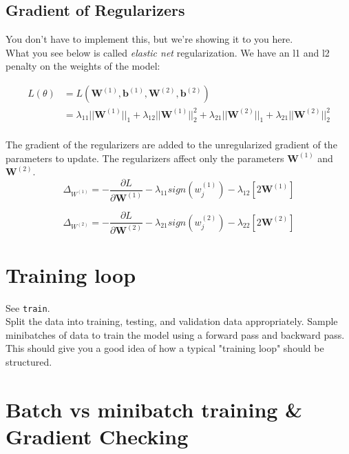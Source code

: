 \documentclass[reqno]{amsart}
\theoremstyle{definition}
\theoremstyle{remark}
\numberwithin{equation}{section}
\begin{document}
\subsection{Gradient of Regularizers}

You don't have to implement this, but we're showing it to you here. \\

What you see below is called \textit{elastic net} regularization. We have an
l1 and l2 penalty on the weights of the model:

\begin{align}
    L(\theta) &= L(\mathbf{W}^{(1)}, \mathbf{b}^{(1)}, \mathbf{W}^{(2)}, \mathbf{b}^{(2)}) \\
    &= \lambda_{11} ||\mathbf{W}^{(1)}||_1 + \lambda_{12} ||\mathbf{W}^{(1)}||_2^2 + \lambda_{21} ||\mathbf{W}^{(2)}||_1 + \lambda_{21} ||\mathbf{W}^{(2)}||_2^2
\end{align}\\

The gradient of the regularizers are added to the unregularized gradient of the
parameters to update. The regularizers affect only the parameters
$\mathbf{W}^{(1)}$ and $\mathbf{W}^{(2)}$. \\

\begin{equation}
    \Delta_{W^{(1)}} = - \frac{\partial L}{\partial \mathbf{W}^{(1)}} - \lambda_{11}sign(w^{(1)}_j) - \lambda_{12}[2\mathbf{W}^{(1)}]
\end{equation}

\begin{equation}
    \Delta_{W^{(2)}} = - \frac{\partial L}{\partial \mathbf{W}^{(2)}} - \lambda_{21}sign(w^{(2)}_j) - \lambda_{22}[2\mathbf{W}^{(2)}]
\end{equation}

\section{Training loop}

See \texttt{train}. \\

Split the data into training, testing, and validation data appropriately. Sample
minibatches of data to train the model using a forward pass and backward pass. \\

This should give you a good idea of how a typical "training loop" should be
structured.

\section{Batch vs minibatch training \& Gradient Checking}
\end{document}
